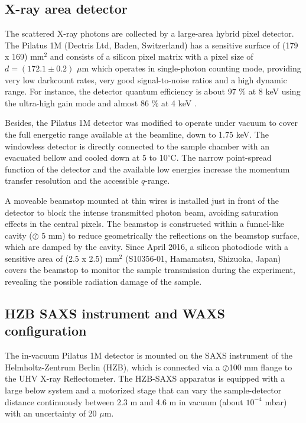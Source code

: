 \subsection{X-ray area detector}
\label{sec:pilatus}

The scattered X-ray photons are collected by a large-area hybrid pixel detector. The Pilatus 1M (Dectris Ltd, Baden, Switzerland) has a sensitive surface of (179 x 169) mm$^2$ and consists of a silicon pixel matrix with a pixel size of $d = (172.1 \pm 0.2)$ $\mu$m which operates in single-photon counting mode, providing very low darkcount rates, very good signal-to-noise ratios and a high dynamic range. For instance, the detector quantum efficiency is about 97 $\%$ at 8 keV using the ultra-high gain mode and almost 86 $\%$ at 4 keV \citep{wernecke_characterization_2014}.

Besides, the Pilatus 1M detector was modified to operate under vacuum to cover the full energetic range available at the beamline, down to 1.75 keV. The windowless detector is directly connected to the sample chamber with an evacuated bellow and cooled down at 5 to 10$^{\circ}$C. The narrow point-spread function of the detector and the available low energies increase the momentum transfer resolution and the accessible $q$-range.

A moveable beamstop mounted at thin wires is installed just in front of the detector to block the intense transmitted photon beam, avoiding saturation effects in the central pixels. The beamstop is constructed within a funnel-like cavity ($\oslash$ 5 mm) to reduce geometrically the reflections on the beamstop surface, which are damped by the cavity. Since April 2016, a silicon photodiode with a sensitive area of (2.5 x 2.5) mm$^2$ (S10356-01, Hamamatsu, Shizuoka, Japan) covers the beamstop to monitor the sample transmission during the experiment, revealing the possible radiation damage of the sample.

\subsection{HZB SAXS instrument and WAXS configuration}
\label{sec:WAXS_experimental}

The in-vacuum Pilatus 1M detector is mounted on the SAXS instrument of the Helmholtz-Zentrum Berlin (HZB), which is connected via a $\oslash$100 mm flange to the UHV X-ray Reflectometer. The HZB-SAXS apparatus is equipped with a large below system and a motorized stage that can vary the sample-detector distance continuously between 2.3 m and 4.6 m in vacuum (about $10^{-4}$ mbar) with an uncertainty of 20 $\mu$m. 

